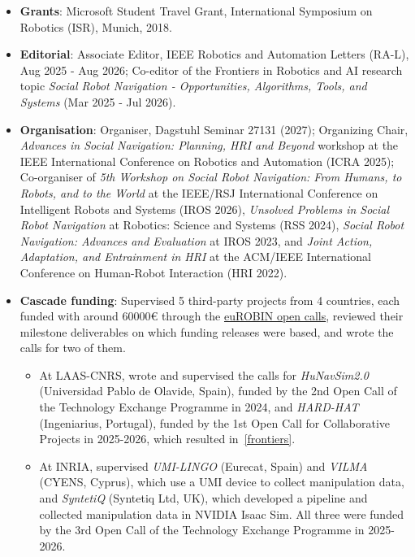 \documentclass[11pt]{article}
\newcommand{\htwo}[2]{\par\vspace{8pt}{\fontsize{13}{16}\selectfont\bfseries\raggedright
  \leftskip=7.6mm\hangindent=9.6mm\hangafter=1\makebox[9.6mm][l]{#1}#2\par}\vspace{6pt}}
\begin{document}
\htwo{1.6.}{Grants and other academic activities}
\begin{itemize}[leftmargin=*,topsep=0pt,itemsep=1pt,parsep=0pt]
    \item \textbf{Grants}: Microsoft Student Travel Grant, International Symposium on Robotics (ISR), Munich, 2018.
    \item \textbf{Editorial}: Associate Editor, IEEE Robotics and Automation Letters (RA-L), Aug 2025 - Aug 2026; Co-editor of the Frontiers in Robotics and AI research topic \textit{Social Robot Navigation - Opportunities, Algorithms, Tools, and Systems} (Mar 2025 - Jul 2026).
    \item \textbf{Organisation}: Organiser, Dagstuhl Seminar 27131 (2027); Organizing Chair, \textit{Advances in Social Navigation: Planning, HRI and Beyond} workshop at the IEEE International Conference on Robotics and Automation (ICRA 2025); Co-organiser of \textit{5th Workshop on Social Robot Navigation: From Humans, to Robots, and to the World} at the IEEE/RSJ International Conference on Intelligent Robots and Systems (IROS 2026), \textit{Unsolved Problems in Social Robot Navigation} at Robotics: Science and Systems (RSS 2024), \textit{Social Robot Navigation: Advances and Evaluation} at IROS 2023, and \textit{Joint Action, Adaptation, and Entrainment in HRI} at the ACM/IEEE International Conference on Human-Robot Interaction (HRI 2022).
    \item \textbf{Cascade funding}: Supervised 5 third-party projects from 4 countries, each funded with around 60000€ through the \href{https://www.eurobin-project.eu/index.php/about-us}{euROBIN open calls}, reviewed their milestone deliverables on which funding releases were based, and wrote the calls for two of them.
    \begin{itemize}[label=--,leftmargin=*,topsep=0pt,itemsep=0pt,parsep=0pt]
        \item At LAAS-CNRS, wrote and supervised the calls for \textit{HuNavSim2.0} (Universidad Pablo de Olavide, Spain), funded by the 2nd Open Call of the Technology Exchange Programme in 2024, and \textit{HARD-HAT} (Ingeniarius, Portugal), funded by the 1st Open Call for Collaborative Projects in 2025-2026, which resulted in~\ref{frontiers}.
        \item At INRIA, supervised \textit{UMI-LINGO} (Eurecat, Spain) and \textit{VILMA} (CYENS, Cyprus), which use a UMI device to collect manipulation data, and \textit{SyntetiQ} (Syntetiq Ltd, UK), which developed a pipeline and collected manipulation data in NVIDIA Isaac Sim. All three were funded by the 3rd Open Call of the Technology Exchange Programme in 2025-2026.

\end{itemize}
\end{itemize}
\end{document}
